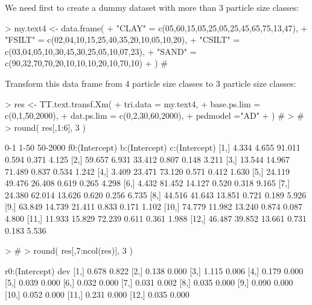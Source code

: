 \documentclass[a4paper]{article}
\begin{document}
We need first to create a dummy dataset with more than 3 particle
size classes:


\begin{Schunk}
\begin{Sinput}
> my.text4 <- data.frame(
+     "CLAY"  = c(05,60,15,05,25,05,25,45,65,75,13,47),
+     "FSILT" = c(02,04,10,15,25,40,35,20,10,05,10,20),
+     "CSILT" = c(03,04,05,10,30,45,30,25,05,10,07,23),
+     "SAND"  = c(90,32,70,70,20,10,10,10,20,10,70,10) 
+ )   #
\end{Sinput}
\end{Schunk}

Transform this data frame from 4 particle size classes to 3 particle
size classes:


\begin{Schunk}
\begin{Sinput}
> res <- TT.text.transf.Xm(
+     tri.data    = my.text4,
+     base.ps.lim = c(0,1,50,2000),
+     dat.ps.lim  = c(0,2,30,60,2000),
+     psdmodel    ="AD"
+ )   #
> #
> round( res[,1:6], 3 ) 
\end{Sinput}
\begin{Soutput}
         0-1   1-50 50-2000 f0:(Intercept) b:(Intercept) c:(Intercept)
 [1,]  4.334  4.655  91.011          0.594         0.371         4.125
 [2,] 59.657  6.931  33.412          0.807         0.148         3.211
 [3,] 13.544 14.967  71.489          0.837         0.534         1.242
 [4,]  3.409 23.471  73.120          0.571         0.412         1.630
 [5,] 24.119 49.476  26.408          0.619         0.265         4.298
 [6,]  4.432 81.452  14.127          0.520         0.318         9.165
 [7,] 24.380 62.014  13.626          0.620         0.256         6.735
 [8,] 44.516 41.643  13.851          0.721         0.189         5.926
 [9,] 63.849 14.739  21.411          0.833         0.171         1.102
[10,] 74.779 11.982  13.240          0.874         0.087         4.800
[11,] 11.933 15.829  72.239          0.611         0.361         1.988
[12,] 46.487 39.852  13.661          0.731         0.183         5.536
\end{Soutput}
\begin{Sinput}
> #
> round( res[,7:ncol(res)], 3 ) 
\end{Sinput}
\begin{Soutput}
      r0:(Intercept)   dev
 [1,]          0.678 0.822
 [2,]          0.138 0.000
 [3,]          1.115 0.006
 [4,]          0.179 0.000
 [5,]          0.039 0.000
 [6,]          0.032 0.000
 [7,]          0.031 0.002
 [8,]          0.035 0.000
 [9,]          0.090 0.000
[10,]          0.052 0.000
[11,]          0.231 0.000
[12,]          0.035 0.000
\end{Soutput}
\end{Schunk}
\end{document}
